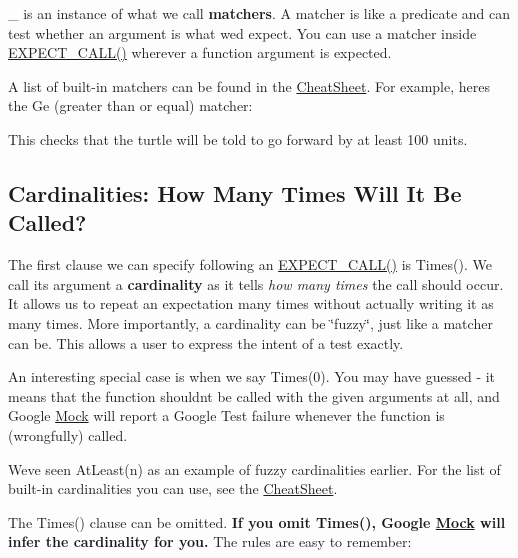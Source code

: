 {\ttfamily \+\_\+} is an instance of what we call {\bfseries{matchers}}. A matcher is like a predicate and can test whether an argument is what we\textquotesingle{}d expect. You can use a matcher inside {\ttfamily \mbox{\hyperlink{gmock-spec-builders_8h_a535a6156de72c1a2e25a127e38ee5232}{E\+X\+P\+E\+C\+T\+\_\+\+C\+A\+L\+L()}}} wherever a function argument is expected.

A list of built-\/in matchers can be found in the \mbox{\hyperlink{CheatSheet_8md}{Cheat\+Sheet}}. For example, here\textquotesingle{}s the {\ttfamily Ge} (greater than or equal) matcher\+:


\begin{DoxyCode}{0}
\end{DoxyCode}


This checks that the turtle will be told to go forward by at least 100 units.

\subsection*{Cardinalities\+: How Many Times Will It Be Called?}

The first clause we can specify following an {\ttfamily \mbox{\hyperlink{gmock-spec-builders_8h_a535a6156de72c1a2e25a127e38ee5232}{E\+X\+P\+E\+C\+T\+\_\+\+C\+A\+L\+L()}}} is {\ttfamily Times()}. We call its argument a {\bfseries{cardinality}} as it tells {\itshape how many times} the call should occur. It allows us to repeat an expectation many times without actually writing it as many times. More importantly, a cardinality can be \char`\"{}fuzzy\char`\"{}, just like a matcher can be. This allows a user to express the intent of a test exactly.

An interesting special case is when we say {\ttfamily Times(0)}. You may have guessed -\/ it means that the function shouldn\textquotesingle{}t be called with the given arguments at all, and Google \mbox{\hyperlink{classMock}{Mock}} will report a Google Test failure whenever the function is (wrongfully) called.

We\textquotesingle{}ve seen {\ttfamily At\+Least(n)} as an example of fuzzy cardinalities earlier. For the list of built-\/in cardinalities you can use, see the \mbox{\hyperlink{CheatSheet_8md}{Cheat\+Sheet}}.

The {\ttfamily Times()} clause can be omitted. {\bfseries{If you omit {\ttfamily Times()}, Google \mbox{\hyperlink{classMock}{Mock}} will infer the cardinality for you.}} The rules are easy to remember\+:


